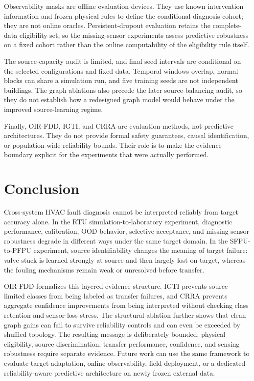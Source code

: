\documentclass[preprint,12pt]{elsarticle}
\begin{document}
Observability masks are offline evaluation devices. They use known intervention information and frozen physical rules to define the conditional diagnosis cohort; they are not online oracles. Persistent-dropout evaluation retains the complete-data eligibility set, so the missing-sensor experiments assess predictive robustness on a fixed cohort rather than the online computability of the eligibility rule itself.

The source-capacity audit is limited, and final seed intervals are conditional on the selected configurations and fixed data. Temporal windows overlap, normal blocks can share a simulation run, and five training seeds are not independent buildings. The graph ablations also precede the later source-balancing audit, so they do not establish how a redesigned graph model would behave under the improved source-learning regime.

Finally, OIR-FDD, IGTI, and CRRA are evaluation methods, not predictive architectures. They do not provide formal safety guarantees, causal identification, or population-wide reliability bounds. Their role is to make the evidence boundary explicit for the experiments that were actually performed.

\section{Conclusion}
Cross-system HVAC fault diagnosis cannot be interpreted reliably from target accuracy alone. In the RTU simulation-to-laboratory experiment, diagnostic performance, calibration, OOD behavior, selective acceptance, and missing-sensor robustness degrade in different ways under the same target domain. In the SFPU-to-PFPU experiment, source identifiability changes the meaning of target failure: valve stuck is learned strongly at source and then largely lost on target, whereas the fouling mechanisms remain weak or unresolved before transfer.

OIR-FDD formalizes this layered evidence structure. IGTI prevents source-limited classes from being labeled as transfer failures, and CRRA prevents aggregate confidence improvements from being interpreted without checking class retention and sensor-loss stress. The structural ablation further shows that clean graph gains can fail to survive reliability controls and can even be exceeded by shuffled topology. The resulting message is deliberately bounded: physical eligibility, source discrimination, transfer performance, confidence, and sensing robustness require separate evidence. Future work can use the same framework to evaluate target adaptation, online observability, field deployment, or a dedicated reliability-aware predictive architecture on newly frozen external data.
\end{document}
